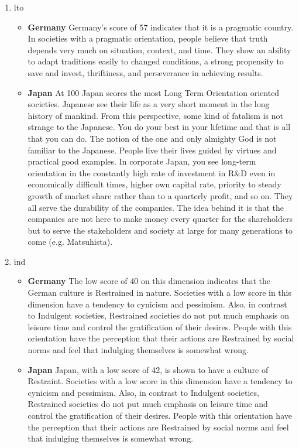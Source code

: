 \begin{enumerate}
    \item \ac{lto}
    \begin{itemize}
        \item \textbf{Germany}
        Germany's score of 57 indicates that it is a pragmatic country.
        In societies with a pragmatic orientation, people believe that truth depends very much on situation, context, and time.
        They show an ability to adapt traditions easily to changed conditions, a strong propensity to save and invest, thriftiness, and perseverance in achieving results.

        \item \textbf{Japan}
        At 100 Japan scores the most Long Term Orientation oriented societies.
        Japanese see their life as a very short moment in the long history of mankind.
        From this perspective, some kind of fatalism is not strange to the Japanese.
        You do your best in your lifetime and that is all that you can do.
        The notion of the one and only almighty God is not familiar to the Japanese.
        People live their lives guided by virtues and practical good examples.
        In corporate Japan, you see long-term orientation in the constantly high rate of investment in R\&D even in economically difficult times, higher own capital rate, priority to steady growth of market share rather than to a quarterly profit, and so on.
        They all serve the durability of the companies.
        The idea behind it is that the companies are not here to make money every quarter for the shareholders but to serve the stakeholders and society at large for many generations to come (e.g. Matsuhista).
    \end{itemize}

    \item \ac{ind}
    \begin{itemize}
        \item \textbf{Germany}
        The low score of 40 on this dimension indicates that the German culture is Restrained in nature.
        Societies with a low score in this dimension have a tendency to cynicism and pessimism.
        Also, in contrast to Indulgent societies, Restrained societies do not put much emphasis on leisure time and control the gratification of their desires.
        People with this orientation have the perception that their actions are Restrained by social norms and feel that indulging themselves is somewhat wrong.

        \item \textbf{Japan}
        Japan, with a low score of 42, is shown to have a culture of Restraint.
        Societies with a low score in this dimension have a tendency to cynicism and pessimism.
        Also, in contrast to Indulgent societies, Restrained societies do not put much emphasis on leisure time and control the gratification of their desires.
        People with this orientation have the perception that their actions are Restrained by social norms and feel that indulging themselves is somewhat wrong.
    \end{itemize}
\end{enumerate}


